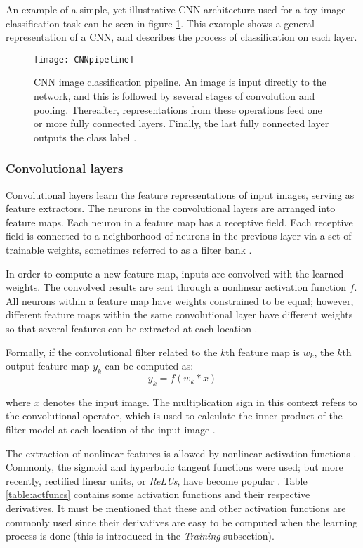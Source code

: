 An example of a simple, yet illustrative CNN architecture used for a toy
image classification task can be seen in figure \ref{fig:CNNpipeline}. This
example shows a general representation of a CNN, and describes the process
of classification on each layer.

\begin{figure}[!h]
	\centering
	\texttt{[image: CNNpipeline]}
	\caption[CNN image classification pipeline]
	{CNN image classification pipeline. An image is input directly to the
  network, and this is followed by several stages of convolution and pooling.
  Thereafter, representations from these operations feed one or more fully
  connected layers. Finally, the last fully connected layer outputs the class
  label \citep{Waseem2017}.}
  \label{fig:CNNpipeline}
\end{figure}


\subsubsection{Convolutional layers}

Convolutional layers learn the feature representations of input images,
serving as feature extractors. The neurons in the convolutional layers are
arranged into feature maps. Each neuron in a feature map has a receptive
field. Each receptive field is connected to a neighborhood of neurons in the
previous layer via a set of trainable weights, sometimes referred to as a
filter bank \citep{LeCun2015}.

In order to compute a new feature map, inputs are convolved with the
learned weights. The convolved results are sent through a nonlinear
activation function $f$. All neurons within a feature map have weights
constrained to be equal; however, different feature maps within the same
convolutional layer have different weights so that several features
can be extracted at each location \citep{LeCun1998, LeCun2015}.

Formally, if the convolutional filter related to the $k$th feature map is
$w_k$, the $k$th output feature map $y_k$ can be computed as:
$$ y_k = f(w_k * x) $$

where $x$ denotes the input image. The multiplication sign in this context
refers to the convolutional operator, which is used to calculate the inner
product of the filter model at each location of the input image \citep{Yu2014}.

The extraction of nonlinear features is allowed by nonlinear activation
functions \citep{Waseem2017}. Commonly, the sigmoid and hyperbolic tangent
functions were used; but more recently, rectified linear units, or
\textit{ReLUs}, \citep{Nair2010} have become popular \citep{LeCun2015}.
Table \ref{table:actfuncs} contains some activation functions and their
respective derivatives. It must be mentioned that these and other activation
functions are commonly used since their derivatives are easy to be computed
when the learning process is done (this is introduced in the \textit{Training}
subsection).


